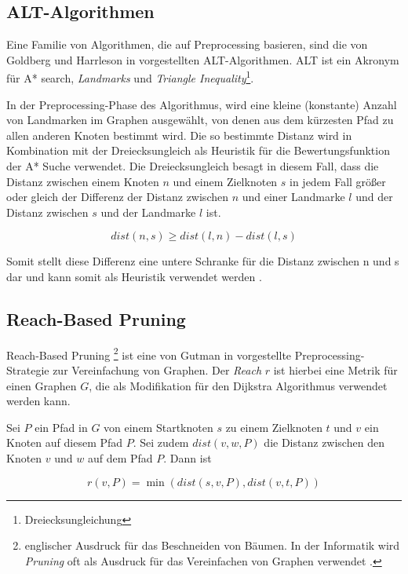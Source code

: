 \subsection{ALT-Algorithmen}
Eine Familie von Algorithmen, die auf Preprocessing basieren, sind die von Goldberg und Harrleson in \cite{Goldberg2005} vorgestellten ALT-Algorithmen. ALT ist ein Akronym für A* search, \textit{Landmarks} und \textit{Triangle Inequality}\footnote{Dreiecksungleichung}. 

In der Preprocessing-Phase des Algorithmus, wird eine kleine (konstante) Anzahl von Landmarken im Graphen ausgewählt, von denen aus dem kürzesten Pfad zu allen anderen Knoten bestimmt wird. Die so bestimmte Distanz wird in Kombination mit der Dreiecksungleich als Heuristik für die Bewertungsfunktion der A* Suche verwendet. Die Dreiecksungleich besagt in diesem Fall, dass die Distanz zwischen einem Knoten $n$ und einem Zielknoten $s$ in jedem Fall größer oder gleich der Differenz  der Distanz zwischen $n$ und einer Landmarke $l$ und der Distanz zwischen $s$ und der Landmarke $l$ ist.

\begin{equation} \label{eq:3.2}
	dist(n,s) \ge dist(l,n)-dist(l,s)
\end{equation}


Somit stellt diese Differenz eine untere Schranke für die Distanz zwischen n und s dar und kann somit als Heuristik verwendet werden \cite{Goldberg2005}.

\subsection{Reach-Based Pruning}
Reach-Based Pruning \footnote{englischer Ausdruck für das Beschneiden von Bäumen. In der Informatik wird \textit{Pruning} oft als Ausdruck für das Vereinfachen von Graphen verwendet \cite{Wikipedia:00}.} ist eine von Gutman in \cite{Gutman2004} vorgestellte Preprocessing-Strategie zur Vereinfachung von Graphen. Der \textit{Reach} $r$ ist hierbei eine Metrik für einen Graphen $G$, die als Modifikation für den Dijkstra Algorithmus verwendet werden kann. 

Sei $P$ ein Pfad in $G$ von einem Startknoten $s$ zu einem Zielknoten $t$ und $v$ ein Knoten auf diesem Pfad $P$. Sei zudem $dist(v,w,P)$ die Distanz zwischen den Knoten $v$ und $w$ auf dem Pfad $P$. Dann ist

\begin{equation} \label{eq:3.3}
	r(v,P) = \min{(dist(s,v,P), dist(v,t,P))}
\end{equation}

